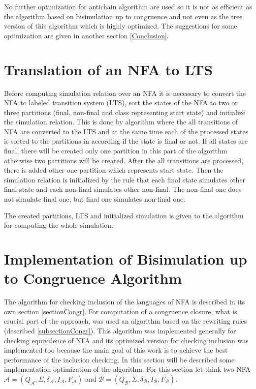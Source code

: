 No further optimization for antichain algorithm are used so it is not as efficient as the algorithm based on bisimulation up to congruence and not even as the 
tree version of this algorithm which is highly optimized. The suggestions for some optimization are given in another section \ref{Conclusion}.

\section{Translation of an NFA to LTS}
Before computing simulation relation over an NFA it is necessary to convert the NFA to labeled transition system (LTS), sort the states of the NFA to
two or three partitions (final, non-final and class representing start state) and initialize the simulation relation. This is done by algorithm where 
the all transitions of NFA are converted to the LTS and at the same time each of the processed states is sorted to the partitions in according if
the state is final or not. If all states are final, there will be created only one partition in this part of the algorithm otherwise two partitions will
be created. After the all transitions are processed, there is added other one partition which represents start state. Then the simulation relation is initialized
by the rule that each final state simulates other final state and each non-final simulates other non-final. The non-final one does not simulate final one, but 
final one simulates non-final one.

The created partitions, LTS and initialized simulation is given to the algorithm for computing the whole simulation. 

\section{Implementation of Bisimulation up to Congruence Algorithm}
\label{sectionCongrImpl}
The algorithm for checking inclusion of the languages of NFA is described in its own section \ref{sectionCongr}. For computation of a congruence closure, 
what is crucial part of the approach, was used an algorithm based on the rewriting rules (described \ref{subsectionCongr}). 
This algorithm was implemented generally for checking equivalence of NFA and its optimized version for checking inclusion was implemented too 
because the main goal of this work is to achieve the best performance of the inclusion checking. In this section will be described some implementation
optimization of the algorithm. For this section let think two NFA $\mathcal{A}=(Q_\mathcal{A},\Sigma,\delta_\mathcal{A},I_\mathcal{A},F_\mathcal{A})$ and
$\mathcal{B}=(Q_\mathcal{B},\Sigma,\delta_\mathcal{B},I_\mathcal{B},F_\mathcal{B})$.


